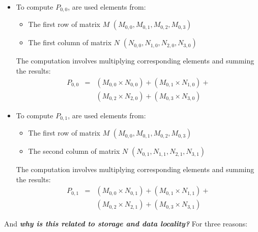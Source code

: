 \begin{itemize}
    \item To compute $P_{0,0}$, are used elements from:
    \begin{itemize}
        \item The first row of matrix $M$ $\left(M_{0,0}, M_{0,1}, M_{0,2}, M_{0,3}\right)$
        \item The first column of matrix $N$ $\left(N_{0,0}, N_{1,0}, N_{2,0}, N_{3,0}\right)$
    \end{itemize}
    
    The computation involves multiplying corresponding elements and summing the results:
    \begin{equation*}
        \begin{array}{rcl}
            P_{0,0} &=& (M_{0,0} \times N_{0,0}) + (M_{0,1} \times N_{1,0}) + \\ [.3em]
                     && (M_{0,2} \times N_{2,0}) + (M_{0,3} \times N_{3,0})
        \end{array}
    \end{equation*}


    \item To compute $P_{0,1}$, are used elements from:
    \begin{itemize}
        \item The first row of matrix $M$ $\left(M_{0,0}, M_{0,1}, M_{0,2}, M_{0,3}\right)$
        \item The second column of matrix $N$ $\left(N_{0,1}, N_{1,1}, N_{2,1}, N_{3,1}\right)$
    \end{itemize}
    
    The computation involves multiplying corresponding elements and summing the results:
    \begin{equation*}
        \begin{array}{rcl}
            P_{0,1} &=& (M_{0,0} \times N_{0,1}) + (M_{0,1} \times N_{1,1}) + \\ [.3em]
                     && (M_{0,2} \times N_{2,1}) + (M_{0,3} \times N_{3,1})
        \end{array}
    \end{equation*}
\end{itemize}
And \emph{\textbf{why is this related to storage and data locality?}} For three reasons:
